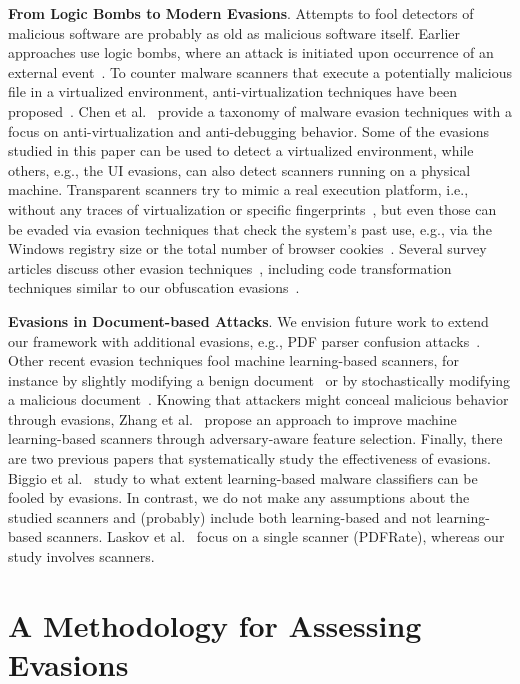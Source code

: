 \textbf{From Logic Bombs to Modern Evasions}.
Attempts to fool detectors of malicious software are probably as old as malicious software itself.
Earlier approaches use logic bombs, where an attack is initiated upon occurrence of an external event~\cite{greenberg1998mobile, avivzienis2004dependability}.
To counter malware scanners that execute a potentially malicious file in a virtualized environment, anti-virtualization techniques have been proposed~\cite{raffetseder2007detecting}.
Chen et al.~\cite{chen2008towards} provide a taxonomy of malware evasion techniques with a focus on anti-virtualization and anti-debugging behavior.
Some of the evasions studied in this paper can be used to detect a virtualized environment, while others, e.g., the UI evasions, can also detect scanners running on a physical machine.
Transparent scanners try to mimic a real execution platform, i.e., without any traces of virtualization or specific fingerprints~\cite{kirat2014barecloud}, but even those can be evaded via evasion techniques that check the system's past use, e.g., via the Windows registry size or the total number of browser cookies~\cite{miramirkhani2017spotless}.
Several survey articles discuss other evasion techniques~\cite{corona2013adversarial,bulazel2017survey}, including code transformation techniques similar to our obfuscation evasions~\cite{you2010malware}.

\textbf{Evasions in Document-based Attacks}.
We envision future work to extend our framework with additional evasions, e.g., PDF parser confusion attacks~\cite{carmony2016extract}.
Other recent evasion techniques fool machine learning-based scanners, for instance by slightly modifying a benign document~\cite{Maiorca2013} or by stochastically modifying a malicious document~\cite{xu2016automatically,Dang2017}.
Knowing that attackers might conceal malicious behavior through evasions, Zhang et al.~\cite{zhang2016adversarial} propose an approach to improve machine learning-based scanners through adversary-aware feature selection.
Finally, there are two previous papers that systematically study the effectiveness of evasions.
Biggio et al.~\cite{biggio2013evasion} study to what extent learning-based malware classifiers can be fooled by evasions.
In contrast, we do not make any assumptions about the studied scanners and (probably) include both learning-based and not learning-based scanners.
Laskov et al.~\cite{laskov2014practical} focus on a single scanner (PDFRate), whereas our study involves \nbAnalyzers{} scanners.


\section{A Methodology for Assessing Evasions}
\label{ss:methodology}

